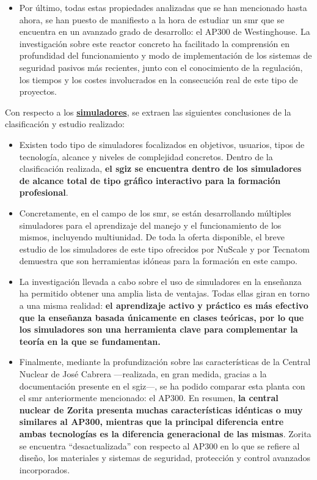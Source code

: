 \begin{itemize}
    \item Por último, todas estas propiedades analizadas que se han mencionado hasta ahora, se han puesto de manifiesto a la hora de estudiar un \acrlong{smr} que se encuentra en un avanzado grado de desarrollo: el AP300 de Westinghouse. La investigación sobre este reactor concreto ha facilitado la comprensión en profundidad del funcionamiento y modo de implementación de los sistemas de seguridad pasivos más recientes, junto con el conocimiento de la regulación, los tiempos y los costes involucrados en la consecución real de este tipo de proyectos.
\end{itemize}

Con respecto a los \underline{\textbf{simuladores}}, se extraen las siguientes conclusiones de la clasificación y estudio realizado:

\begin{itemize}
    \item Existen todo tipo de simuladores focalizados en objetivos, usuarios, tipos de tecnología, alcance y niveles de complejidad concretos. Dentro de la clasificación realizada, \textbf{el \acrshort{sgiz} se encuentra dentro de los simuladores de alcance total de tipo gráfico interactivo para la formación profesional}.
    \item Concretamente, en el campo de los \acrshort{smr}, se están desarrollando múltiples simuladores para el aprendizaje del manejo y el funcionamiento de los mismos, incluyendo  multiunidad. De toda la oferta disponible, el breve estudio de los simuladores de este tipo ofrecidos por NuScale y por Tecnatom demuestra que son herramientas idóneas para la formación en este campo.
    \item La investigación llevada a cabo sobre el uso de simuladores en la enseñanza ha permitido obtener una amplia lista de ventajas. Todas ellas giran en torno a una misma realidad: \textbf{el aprendizaje activo y práctico es más efectivo que la enseñanza basada únicamente en clases teóricas, por lo que los simuladores son una herramienta clave para complementar la teoría en la que se fundamentan.}
    \item Finalmente, mediante la profundización sobre las características de la Central Nuclear de José Cabrera ---realizada, en gran medida, gracias a la documentación presente en el \acrshort{sgiz}---, se ha podido comparar esta planta con el \acrshort{smr} anteriormente mencionado: el AP300. En resumen, \textbf{la central nuclear de Zorita presenta muchas características idénticas o muy similares al AP300, mientras que la principal diferencia entre ambas tecnologías es la diferencia generacional de las mismas}. Zorita se encuentra ``desactualizada'' con respecto al AP300 en lo que se refiere al diseño, los materiales y sistemas de seguridad, protección y control avanzados incorporados.
\end{itemize}
  
